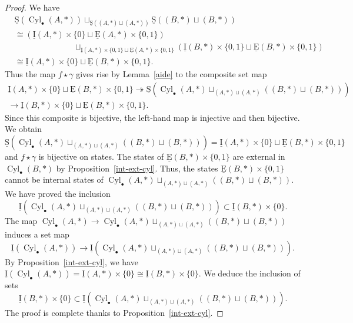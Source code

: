\documentclass[a4paper,12pt]{amsart}
\begin{document}
\begin{proof} We have
\begin{align*}
&\operatorname{\underline{S}}(\operatorname{{Cyl}}_\bullet(A,*)) \sqcup_{\operatorname{\underline{S}}((A,*)\sqcup(A,*))} \operatorname{\underline{S}}((B,*)\sqcup (B,*)) \\
&{\cong} (\operatorname{\underline{I}}(A,*) \times \{0\} \sqcup \operatorname{\underline{E}}(A,*) \times\{0,1\} )
\\ &\hspace{3cm}\sqcup_{\operatorname{\underline{I}}(A,*)\times \{0,1\} \sqcup \operatorname{\underline{E}}(A,*)\times \{0,1\}} \left(\operatorname{\underline{I}}(B,*)\times \{0,1\} \sqcup \operatorname{\underline{E}}(B,*)\times \{0,1\}\right)\\
&{\cong} \operatorname{\underline{I}}(A,*) \times \{0\}\sqcup \operatorname{\underline{E}}(B,*)\times \{0,1\}.
\end{align*}
Thus the map $f\star \gamma$ gives rise by Lemma~\ref{aide} to the composite set map 
\begin{multline*}
\operatorname{\underline{I}}(A,*) \times \{0\}\sqcup \operatorname{\underline{E}}(B,*)\times \{0,1\} \twoheadrightarrow \operatorname{\underline{S}}(\operatorname{{Cyl}}_\bullet(A,*)
\sqcup_{(A,*)\sqcup (A,*)} ((B,*)\sqcup (B,*))) \\\longrightarrow \operatorname{\underline{I}}(B,*) \times \{0\}\sqcup \operatorname{\underline{E}}(B,*)\times \{0,1\}.
\end{multline*}
Since this composite is bijective, the left-hand map is injective and
then bijective. We obtain
\[\operatorname{\underline{S}}(\operatorname{{Cyl}}_\bullet(A,*)
\sqcup_{(A,*)\sqcup (A,*)} ((B,*)\sqcup (B,*))) = \operatorname{\underline{I}}(A,*)\times \{0\}
\sqcup \operatorname{\underline{E}}(B,*)\times \{0,1\}\] and $f\star \gamma$ is bijective on
states. The states of $\operatorname{\underline{E}}(B,*)\times \{0,1\}$ are external in
$\operatorname{{Cyl}}_\bullet(B,*)$ by Proposition~\ref{int-ext-cyl}. Thus, the states
$\operatorname{\underline{E}}(B,*)\times \{0,1\}$ cannot be internal states of $\operatorname{{Cyl}}_\bullet(A,*)
\sqcup_{(A,*)\sqcup (A,*)} ((B,*)\sqcup (B,*))$. We have proved the
inclusion \[\operatorname{\underline{I}}(\operatorname{{Cyl}}_\bullet(A,*) \sqcup_{(A,*)\sqcup (A,*)}
((B,*)\sqcup (B,*))) \subset \operatorname{\underline{I}}(B,*)\times \{0\}.\] The map
$\operatorname{{Cyl}}_\bullet(A,*) \to \operatorname{{Cyl}}_\bullet(A,*) \sqcup_{(A,*)\sqcup (A,*)}
((B,*)\sqcup (B,*))$ induces a set map \[\operatorname{\underline{I}}(\operatorname{{Cyl}}_\bullet(A,*)) \to
\operatorname{\underline{I}}(\operatorname{{Cyl}}_\bullet(A,*) \sqcup_{(A,*)\sqcup (A,*)} ((B,*)\sqcup
(B,*))).\] By Proposition~\ref{int-ext-cyl}, we have
$\operatorname{\underline{I}}(\operatorname{{Cyl}}_\bullet(A,*))=\operatorname{\underline{I}}(A,*) \times \{0\} {\cong} \operatorname{\underline{I}}(B,*)\times
\{0\}$. We deduce the inclusion of sets \[\operatorname{\underline{I}}(B,*)\times \{0\} \subset
\operatorname{\underline{I}}(\operatorname{{Cyl}}_\bullet(A,*) \sqcup_{(A,*)\sqcup (A,*)} ((B,*)\sqcup
(B,*))).\] The proof is complete thanks to
Proposition~\ref{int-ext-cyl}.  \end{proof}
\end{document}
